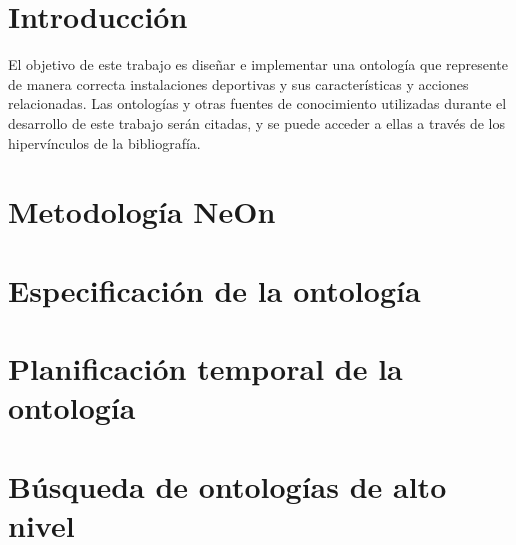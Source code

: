 \documentclass[a4paper,12pt]{article}
\begin{document}
	
	\setlength{\parindent}{0.5cm}
	\setlength{\voffset}{-2cm}
	\setlength{\hoffset}{-2cm}
	
	
	
	\tableofcontents
	
\newpage

	\section{Introducción}
	
	El objetivo de este trabajo es diseñar e implementar una ontología que represente de manera correcta instalaciones deportivas y sus características y acciones relacionadas. Las ontologías y otras fuentes de conocimiento utilizadas durante el desarrollo de este trabajo serán citadas, y se puede acceder a ellas a través de los hipervínculos de la bibliografía.
	
	\section{Metodología NeOn}
	
	\section{Especificación de la ontología}
	
	\section{Planificación temporal de la ontología}
	
	\section{Búsqueda de ontologías de alto nivel}
	
\end{document}
